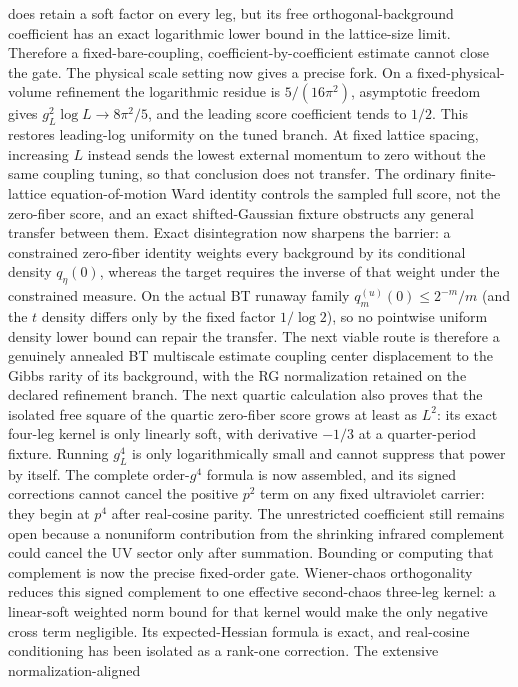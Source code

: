 \documentclass[11pt]{article}
\theoremstyle{definition}
\theoremstyle{remark}
\begin{document}
does retain a soft factor on every leg, but its free orthogonal-background
coefficient has an exact logarithmic lower bound in the lattice-size limit.
Therefore a
fixed-bare-coupling, coefficient-by-coefficient estimate cannot close the
gate.  The physical scale setting now gives a precise fork.  On a
fixed-physical-volume refinement the logarithmic residue is
$5/(16\pi^2)$, asymptotic freedom gives
$g_L^2\log L\to8\pi^2/5$, and the leading score coefficient tends to $1/2$.
This restores leading-log uniformity on the tuned branch.  At fixed lattice
spacing, increasing $L$ instead sends the lowest external momentum to zero
without the same coupling tuning, so that conclusion does not transfer.
The ordinary finite-lattice equation-of-motion Ward identity controls the
sampled full score, not the zero-fiber score, and an exact shifted-Gaussian
fixture obstructs any general transfer between them.  Exact disintegration
now sharpens the barrier: a constrained zero-fiber identity weights every
background by its conditional density $q_\eta(0)$, whereas the target requires
the inverse of that weight under the constrained measure.  On the actual BT
runaway family $q_m^{(u)}(0)\leq2^{-m}/m$ (and the $t$ density differs only
by the fixed factor $1/\log2$), so no pointwise uniform density lower
bound can repair the transfer.  The next viable route is therefore a
genuinely annealed BT multiscale estimate coupling center displacement to the
Gibbs rarity of its background, with the RG normalization retained on the
declared refinement branch.
The next quartic calculation also proves that the isolated free square of the
quartic zero-fiber score grows at least as $L^2$: its exact four-leg kernel is
only linearly soft, with derivative $-1/3$ at a quarter-period fixture.
Running $g_L^4$ is only logarithmically small and cannot suppress that power
by itself.  The complete order-$g^4$ formula is now assembled, and its signed
corrections cannot cancel the positive $p^2$ term on any fixed ultraviolet
carrier: they begin at $p^4$ after real-cosine parity.  The unrestricted
coefficient still remains open because a nonuniform contribution from the
shrinking infrared complement could cancel the UV sector only after
summation.  Bounding or computing that complement is now the precise
fixed-order gate.  Wiener-chaos orthogonality reduces this signed complement
to one effective second-chaos three-leg kernel: a linear-soft weighted norm
bound for that kernel would make the only negative cross term negligible.
Its expected-Hessian formula is exact, and real-cosine conditioning has been
isolated as a rank-one correction.  The extensive normalization-aligned
\end{document}
